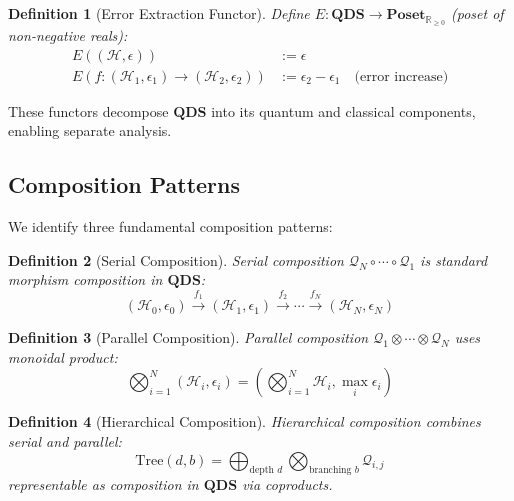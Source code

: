 \documentclass[11pt]{article}
\newtheorem{definition}{Definition}
\begin{document}
\begin{definition}[Error Extraction Functor]
Define $E : \mathbf{QDS} \to \mathbf{Poset}_{\mathbb{R}_{\geq 0}}$ (poset of non-negative reals):
\begin{align}
E((\mathcal{H}, \epsilon)) &:= \epsilon \\
E(f : (\mathcal{H}_1, \epsilon_1) \to (\mathcal{H}_2, \epsilon_2)) &:= \epsilon_2 - \epsilon_1 \quad \text{(error increase)}
\end{align}
\end{definition}

These functors decompose $\mathbf{QDS}$ into its quantum and classical components, enabling separate analysis.

\subsection{Composition Patterns}

We identify three fundamental composition patterns:

\begin{definition}[Serial Composition]
Serial composition $\mathcal{Q}_N \circ \cdots \circ \mathcal{Q}_1$ is standard morphism composition in $\mathbf{QDS}$:
\begin{equation}
(\mathcal{H}_0, \epsilon_0) \xrightarrow{f_1} (\mathcal{H}_1, \epsilon_1) \xrightarrow{f_2} \cdots \xrightarrow{f_N} (\mathcal{H}_N, \epsilon_N)
\end{equation}
\end{definition}

\begin{definition}[Parallel Composition]
Parallel composition $\mathcal{Q}_1 \otimes \cdots \otimes \mathcal{Q}_N$ uses monoidal product:
\begin{equation}
\bigotimes_{i=1}^N (\mathcal{H}_i, \epsilon_i) = \left(\bigotimes_{i=1}^N \mathcal{H}_i, \max_i \epsilon_i\right)
\end{equation}
\end{definition}

\begin{definition}[Hierarchical Composition]
Hierarchical composition combines serial and parallel:
\begin{equation}
\text{Tree}(d, b) = \bigoplus_{\text{depth } d} \bigotimes_{\text{branching } b} \mathcal{Q}_{i,j}
\end{equation}
representable as composition in $\mathbf{QDS}$ via coproducts.
\end{definition}
\end{document}
